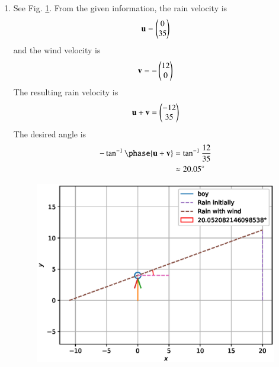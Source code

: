 \renewcommand{\theequation}{\theenumi}
\begin{enumerate}[label=\arabic*.,ref=\thesubsubsection.\theenumi]
%
\item See Fig. \ref{fig:3.8.1_speed}.  From the given information,  the rain velocity is
\begin{align}
\mathbf{u} = \begin{pmatrix}0\\35\end{pmatrix}
\end{align}
%
and the wind velocity is 
\begin{align}
\mathbf{v} = -\begin{pmatrix}12\\0\end{pmatrix}
\end{align}
%
The resulting rain velocity is 
\begin{align}
\mathbf{u}+\mathbf{v} = \begin{pmatrix}-12\\35\end{pmatrix}
\end{align}
The desired angle is 
\begin{align}
-\tan^{-1}\phase{\vec{u}+\vec{v}} &= \tan^{-1}\frac{12}{35}
\\
&\approx 20.05 \degree
\end{align}  
\begin{figure}[!ht]
\includegraphics[width=\columnwidth]{./figs/line/speed.eps}
\caption{}
\label{fig:3.8.1_speed}
\end{figure}
\end{enumerate}
